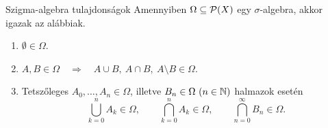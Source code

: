 \documentclass[
]{elteikthesis}[2024/04/26]
\begin{document}
	\begin{statement}{Szigma-algebra tulajdonságok}{}
		Amennyiben \( \Omega \subseteq \mathcal{P}( X ) \) egy \( \sigma \)-algebra,
		akkor igazak az alábbiak.
		\begin{enumerate}[label={(\( \Sigma \)\arabic*)}, ref={\( \Sigma \)\arabic*.}, start=4]
			\item\label{eq:sigma-algebra-04}
			\( \emptyset \in \Omega \).
			
			\item\label{eq:sigma-algebra-05}
			\( 
				A, B \in \Omega 
				\quad \Longrightarrow \quad 
				A \cup B,\ A \cap B,\ A \setminus B \in \Omega
			\).
			
			\item\label{eq:sigma-algebra-06}
			Tetszőleges \( A_0, \dots, A_n \in \Omega \), 
			illetve \( B_n \in \Omega \ (n \in \mathbb{N}) \) halmazok esetén
			\[
				\bigcup_{k=0}^{n}      A_k \in \Omega, \qquad
				\bigcap_{k=0}^{n}      A_k \in \Omega, \qquad
				\bigcap_{n=0}^{\infty} B_n \in \Omega.
			\]
		\end{enumerate}
	\end{statement}
\end{document}
